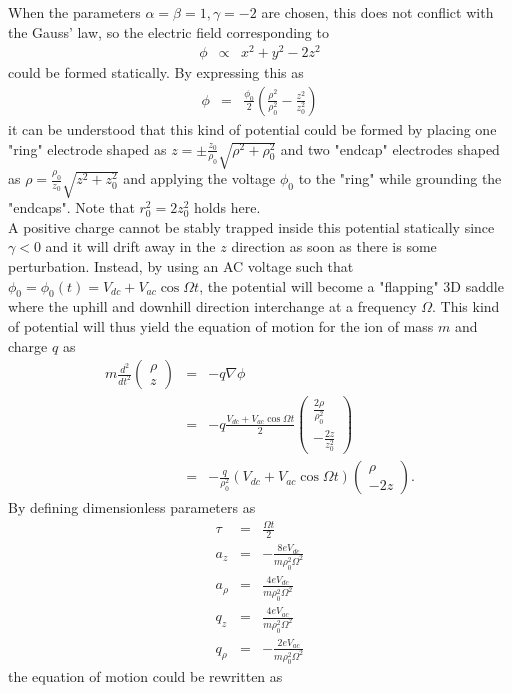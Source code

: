 \documentclass{article}
\begin{document}
When the parameters $\alpha = \beta = 1, \gamma = -2$ are chosen, this does not conflict with the Gauss' law, so the electric field corresponding to
\begin{eqnarray*}
\phi & \propto & x^2 + y^2 - 2z^2
\end{eqnarray*}
could be formed statically. By expressing this as
\begin{eqnarray*}
\phi & = & \frac{\phi_0}{2} \left( \frac{\rho^2}{\rho_0^2} - \frac{z^2}{z_0^2} \right)
\end{eqnarray*}
it can be understood that this kind of potential could be formed by placing one "ring" electrode shaped as $z = \pm \frac{z_0}{\rho_0}\sqrt{ \rho^2 + \rho_0^2}$ and two "endcap" electrodes shaped as $\rho = \frac{\rho_0}{z_0}\sqrt{z^2 + z_0^2}$ and applying the voltage $\phi_0$ to the "ring" while grounding the "endcaps". Note that $r_0^2 = 2z_0^2$ holds here. \\

A positive charge cannot be stably trapped inside this potential statically since $\gamma < 0$ and it will drift away in the $z$ direction as soon as there is some perturbation. Instead, by using an AC voltage such that $\phi_0 = \phi_0(t) = V_{dc} + V_{ac} \cos{\Omega t}$, the potential will become a "flapping" 3D saddle where the uphill and downhill direction interchange at a frequency $\Omega$. This kind of potential will thus yield the equation of motion for the ion of mass $m$ and charge $q$ as
\begin{eqnarray*}
m \frac{d^2}{dt^2} \left(
\begin{array}{c} 
	\rho \\
	z
\end{array} \right) & = & -q \nabla \phi \\
& = & -q \frac{ V_{dc} + V_{ac} \cos{\Omega t} }{2} \left(
\begin{array}{c}
	\frac{2\rho}{\rho_0^2} \\
	-\frac{2z}{z_0^2}
\end{array} \right) \\
& = & -\frac{q}{\rho_0^2} \left( V_{dc} + V_{ac} \cos{\Omega t} \right) \left(
\begin{array}{c}
	\rho \\
	-2z
\end{array} \right).
\end{eqnarray*}
By defining dimensionless parameters as
\begin{eqnarray*}
\tau & = & \frac{\Omega t}{2} \\
a_z & = & -\frac{8eV_{dc}}{m\rho_0^2 \Omega^2} \\
a_\rho & = & \frac{4eV_{dc}}{m\rho_0^2 \Omega^2} \\
q_z & = & \frac{4eV_{ac}}{m\rho_0^2 \Omega^2} \\
q_\rho & = & -\frac{2eV_{ac}}{m\rho_0^2 \Omega^2}
\end{eqnarray*}
the equation of motion could be rewritten as
\end{document}
